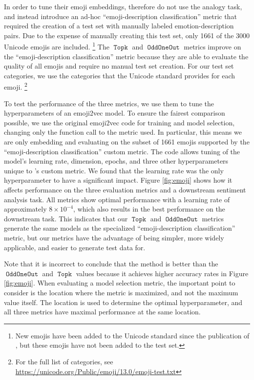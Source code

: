 \documentclass[11pt,a4paper]{article}
\DeclareMathOperator{\OddOneOut}{\texttt{OddOneOut}}
\DeclareMathOperator{\topk}{\texttt{Topk}}
\begin{document}
In order to tune their emoji embeddings, \citet{eisner2016emoji2vec} therefore do not use the analogy task,
and instead introduce an ad-hoc ``emoji-description classification'' metric that required the creation of a test set with manually labeled emotion-description pairs.
Due to the expense of manually creating this test set,
only 1661 of the 3000 Unicode emojis are included.%
\footnote{New emojis have been added to the Unicode standard since the publication of \citet{eisner2016emoji2vec},
but these emojis have not been added to the test set.
}
The $\topk$ and $\OddOneOut$ metrics improve on the ``emoji-description classification'' metric because they are able to evaluate the quality of all emojis and require no manual test set creation.
For our test set categories, we use the categories that the Unicode standard provides for each emoji.%
\footnote{For the full list of categories, see \url{https://unicode.org/Public/emoji/13.0/emoji-test.txt}}


To test the performance of the three metrics,
we use them to tune the hyperparameters of an emoji2vec model.
To ensure the fairest comparison possible, we use the original emoji2vec code for training and model selection,
changing only the function call to the metric used.
In particular, this means we are only embedding and evaluating on the subset of 1661 emojis supported by the ``emoji-description classification'' custom metric.
The code allows tuning of the model's learning rate, dimension, epochs, and three other hyperparameters unique to \citet{eisner2016emoji2vec}'s custom metric.
We found that the learning rate was the only hyperparameter to have a significant impact.
Figure \ref{fig:emoji} shows how it affects performance on the three evaluation metrics and a downstream sentiment analysis task.
All metrics show optimal performance with a learning rate of approximately $8\times10^{-4}$,
which also results in the best performance on the downstream task.
This indicates that our $\topk$ and $\OddOneOut$ metrics generate the same models as the specialized ``emoji-description classification'' metric,
but our metrics have the advantage of being simpler, more widely applicable, and easier to generate test data for.

Note that it is incorrect to conclude that the \citet{eisner2016emoji2vec} method is better than the $\OddOneOut$ and $\topk$ values because it achieves higher accuracy rates in Figure \ref{fig:emoji}.
When evaluating a model selection metric,
the important point to consider is the location where the metric is maximized,
and not the maximum value itself.
The location is used to determine the optimal hyperparameter,
and all three metrics have maximal performance at the same location.
\end{document}

